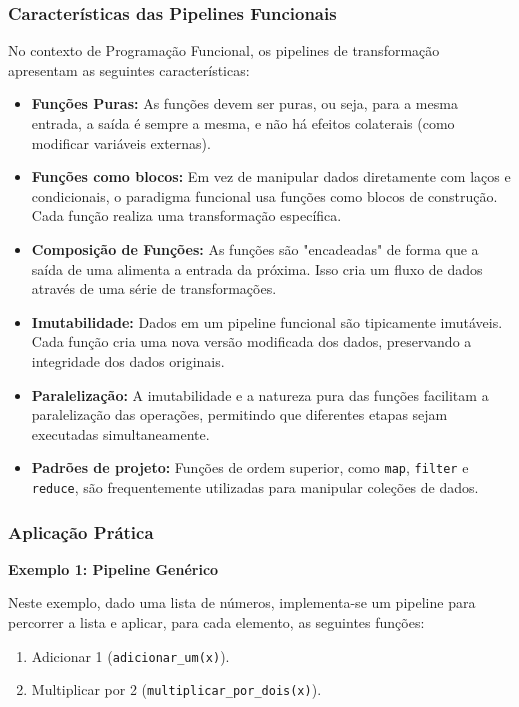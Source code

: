 \subsubsection{Características das Pipelines Funcionais}
No contexto de Programação Funcional, os pipelines de transformação apresentam as seguintes características:
\begin{itemize}
    \item \textbf{Funções Puras:} As funções devem ser puras, ou seja, para a mesma entrada, a saída é sempre a mesma, e não há efeitos colaterais (como modificar variáveis externas).
    \item \textbf{Funções como blocos:} Em vez de manipular dados diretamente com laços e condicionais, o paradigma funcional usa funções como blocos de construção. Cada função realiza uma transformação específica.
    \item \textbf{Composição de Funções:} As funções são "encadeadas" de forma que a saída de uma alimenta a entrada da próxima. Isso cria um fluxo de dados através de uma série de transformações.
    \item \textbf{Imutabilidade:} Dados em um pipeline funcional são tipicamente imutáveis. Cada função cria uma nova versão modificada dos dados, preservando a integridade dos dados originais.
    \item \textbf{Paralelização:} A imutabilidade e a natureza pura das funções facilitam a paralelização das operações, permitindo que diferentes etapas sejam executadas simultaneamente.
    \item \textbf{Padrões de projeto:} Funções de ordem superior, como \texttt{map}, \texttt{filter} e \texttt{reduce}, são frequentemente utilizadas para manipular coleções de dados.
\end{itemize}

\subsubsection{Aplicação Prática}
\textbf{Exemplo 1: Pipeline Genérico}

Neste exemplo, dado uma lista de números, implementa-se um pipeline para percorrer a lista e aplicar, para cada elemento, as seguintes funções:
\begin{enumerate}
    \item Adicionar 1 (\texttt{adicionar\_um(x)}).
    \item Multiplicar por 2 (\texttt{multiplicar\_por\_dois(x)}).
\end{enumerate}

